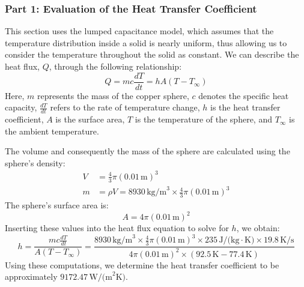 \documentclass{article}
\numberwithin{equation}{section}
\begin{document}
\subsubsection*{Part 1: Evaluation of the Heat Transfer Coefficient}
This section uses the lumped capacitance model, which assumes that the temperature distribution inside a solid is nearly uniform, thus allowing us to consider the temperature throughout the solid as constant. We can describe the heat flux, $Q$, through the following relationship:
\begin{equation}
    Q = mc\frac{dT}{dt} = hA(T - T_{\infty})
\end{equation}
Here, $m$ represents the mass of the copper sphere, $c$ denotes the specific heat capacity, $\frac{dT}{dt}$ refers to the rate of temperature change, $h$ is the heat transfer coefficient, $A$ is the surface area, $T$ is the temperature of the sphere, and $T_{\infty}$ is the ambient temperature.

The volume and consequently the mass of the sphere are calculated using the sphere's density:
\begin{align}
    V &= \frac{4}{3}\pi (0.01 \, \text{m})^3 \\
    m &= \rho V = 8930 \, \text{kg/m}^3 \times \frac{4}{3}\pi (0.01 \, \text{m})^3
\end{align}
The sphere's surface area is:
\begin{equation}
    A = 4\pi (0.01 \, \text{m})^2
\end{equation}
Inserting these values into the heat flux equation to solve for $h$, we obtain:
\begin{equation}
    h = \frac{mc\frac{dT}{dt}}{A(T - T_{\infty})} = \frac{8930 \, \text{kg/m}^3 \times \frac{4}{3}\pi (0.01 \, \text{m})^3 \times 235 \, \text{J/(kg} \cdot \text{K)} \times 19.8 \, \text{K/s}}{4\pi (0.01 \, \text{m})^2 \times (92.5 \, \text{K} - 77.4 \, \text{K})}
\end{equation}
Using these computations, we determine the heat transfer coefficient to be approximately $9172.47 \, \text{W/(m}^2\text{K)}$.
\end{document}
